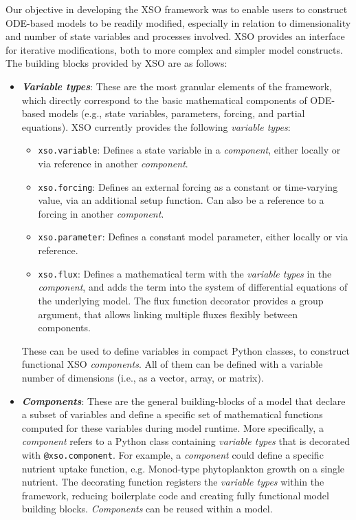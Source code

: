 \documentclass[journal abbreviation, manuscript]{copernicus}
\begin{document}
Our objective in developing the XSO framework was to enable users to construct ODE-based models to be readily modified, especially in relation to dimensionality and number of state variables and processes involved. XSO provides an interface for iterative modifications, both to more complex and simpler model constructs. The building blocks provided by XSO are as follows:


\begin{itemize}
    \item  \textbf{\textit{Variable types}}: These are the most granular elements of the framework, which directly correspond to the basic mathematical components of ODE-based models (e.g., state variables, parameters, forcing, and partial equations). XSO currently provides the following \textit{variable types}: 
    \begin{itemize}
        \item \texttt{xso.variable}: Defines a state variable in a \textit{component}, either locally or via reference in another \textit{component}.
        \item \texttt{xso.forcing}: Defines an external forcing as a constant or time-varying value, via an additional setup function. Can also be a reference to a forcing in another \textit{component}.
        \item \texttt{xso.parameter}: Defines a constant model parameter, either locally or via reference.
        \item \texttt{xso.flux}: Defines a mathematical term with the \textit{variable types} in the \textit{component}, and adds the term into the system of differential equations of the underlying model. The flux function decorator provides a group argument, that allows linking multiple fluxes flexibly between components.
    \end{itemize}
    These can be used to define variables in compact Python classes, to construct functional XSO \textit{components}. All of them can be defined with a variable number of dimensions (i.e., as a vector, array, or matrix).

    \item \textbf{\textit{Components}}: These are the general building-blocks of a model that declare a subset of variables and define a specific set of mathematical functions computed for these variables during model runtime. More specifically, a \textit{component} refers to a Python class containing \textit{variable types} that is decorated with \texttt{@xso.component}. For example, a \textit{component} could define a specific nutrient uptake function, e.g. Monod-type phytoplankton growth on a single nutrient. The decorating function registers the \textit{variable types} within the framework, reducing boilerplate code and creating fully functional model building blocks. \textit{Components} can be reused within a model.
    

\end{itemize}
\end{document}
